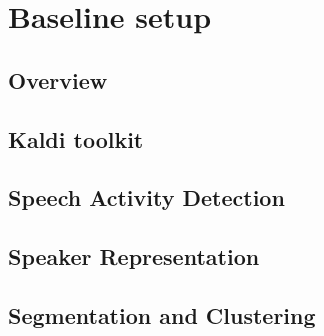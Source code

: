 \chapter{Baseline setup}

\section{Overview}

\section{Kaldi toolkit}

\section{Speech Activity Detection}

\section{Speaker Representation}

\section{Segmentation and Clustering}